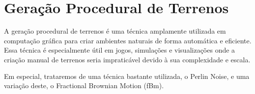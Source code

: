 \section{Geração Procedural de Terrenos}
\label{sec:terrenos}

A geração procedural de terrenos é uma técnica amplamente utilizada em computação gráfica para criar ambientes naturais de forma automática e eficiente. Essa técnica é especialmente útil em jogos, simulações e visualizações onde a criação manual de terrenos seria impraticável devido à sua complexidade e escala.

Em especial, trataremos de uma técnica bastante utilizada, o Perlin Noise, e uma variação deste, o Fractional Brownian Motion (fBm).


